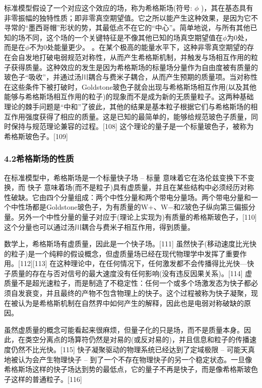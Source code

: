 标准模型假设了一个对应这个效应的场，称为希格斯场(符号: $\phi$ )，其在基态具有非零振幅的独特性质；即非零真空期望值。它之所以能产生这种效果，是因为它不寻常的“墨西哥帽”形状的势，其最低点不在它的“中心”。简单地说，与所有其他已知的场不同，这个场的一个关键特征是不像其他已知的场真空期望值在$\phi$为0处，而是在$\phi$不为0处能量更少。 。在某个极高的能量水平下，这种非零真空期望的存在会自发地打破电弱规范对称性，从而产生希格斯机制，并触发与场相互作用的粒子获得质量。这种效应的发生是因为希格斯场的标量场分量作为自由度被有质量的玻色子“吸收”，并通过汤川耦合与费米子耦合，从而产生预期的质量项。当对称性在这些条件下被打破时，Goldstone玻色子就会出现与希格斯场相互作用(以及其他能够与希格斯场相互作用的粒子)的现象而不是成为新的无质量粒子。这两种基础理论的棘手问题是“中和”了彼此，其他的结果是基本粒子根据它们与希格斯场的相互作用强度获得了相应的质量。这是已知的最简单的，能够给规范玻色子质量，同时保持与规范理论兼容的过程。[108] 这个理论的量子是一个标量玻色子，被称为希格斯玻色子。[109]

\subsubsection{4.2希格斯场的性质}

在标准模型中，希格斯场是一个标量快子场 – 标量 意味着它在洛伦兹变换下不变换，而 快子 意味着场(而不是粒子)具有虚质量，并且在某些结构中必须经历对称性破缺。它由四个分量组成：两个中性分量和两个带电分量场。两个带电分量和一个中性场都是Goldstone玻色子，为有质量的W+、W−和Z玻色子纵向第三偏振分量。另外一个中性分量的量子对应于(理论上实现为)有质量的希格斯玻色子，[110] 这个分量也可以通过汤川耦合与费米子相互作用，得到质量。

数学上，希格斯场有虚质量，因此是一个快子场。[111] 虽然快子(移动速度比光快的粒子)是一个纯粹的假设概念，但虚质量场已经在现代物理学中发挥了重要作用。[112][113] 在这种理论中，在任何情况下，任何激发都不会传播得比光快—快子质量的存在与否对信号的最大速度没有任何影响(没有违反因果关系)。[114] 虚质量不是超光速粒子，而是制造了不稳定性：任何一个或多个场激发态为快子都必须自发衰变，并且最终的产物不包含物理上的快子。这个过程被称为快子凝聚，现在被认为是希格斯机制在自然界中如何产生的解释，因此也是电弱对称破缺的原因。

虽然虚质量的概念可能看起来很麻烦，但量子化的只是场，而不是质量本身。因此，在类空分离点的场算符仍然是对易的(或反对易的)，并且信息和粒子的传播速度仍然不比光快。[115] 快子凝聚驱动的物理系统已经达到了定域极限 – 可能天真地被认为会产生物理快子 – 到了一个不存在物理快子的另一个稳定状态。一旦像希格斯场这样的快子场达到势的最低点，它的量子不再是快子，而是像希格斯玻色子这样的普通粒子。[116]

